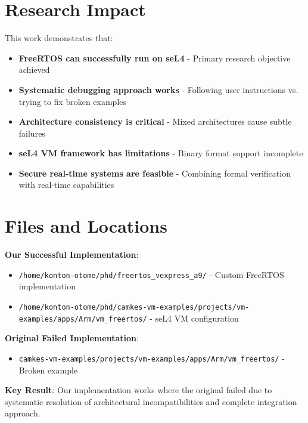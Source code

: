 \documentclass[12pt]{article}
\begin{document}
\section{Research Impact}

This work demonstrates that:
\begin{itemize}
\item \textbf{FreeRTOS can successfully run on seL4} - Primary research objective achieved
\item \textbf{Systematic debugging approach works} - Following user instructions vs. trying to fix broken examples
\item \textbf{Architecture consistency is critical} - Mixed architectures cause subtle failures
\item \textbf{seL4 VM framework has limitations} - Binary format support incomplete
\item \textbf{Secure real-time systems are feasible} - Combining formal verification with real-time capabilities
\end{itemize}

\section{Files and Locations}

\textbf{Our Successful Implementation}:
\begin{itemize}
\item \texttt{/home/konton-otome/phd/freertos\_vexpress\_a9/} - Custom FreeRTOS implementation
\item \texttt{/home/konton-otome/phd/camkes-vm-examples/projects/vm-examples/apps/Arm/vm\_freertos/} - seL4 VM configuration
\end{itemize}

\textbf{Original Failed Implementation}:
\begin{itemize}  
\item \texttt{camkes-vm-examples/projects/vm-examples/apps/Arm/vm\_freertos/} - Broken example
\end{itemize}

\textbf{Key Result}: Our implementation works where the original failed due to systematic resolution of architectural incompatibilities and complete integration approach.
\end{document}
